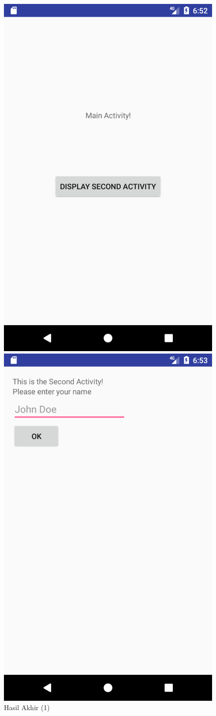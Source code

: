 \documentclass{scrartcl}
\begin{document}
\begin{enumerate}
	\begin{figure}[htbp]
	\begin{minipage}{.5\textwidth}
		\centering
		\includegraphics[width=0.7\linewidth]{Screenshot_1496836379}
		\caption{Hasil Akhir (1)}
		\label{fig:screenshot_1496836379}
	\end{minipage}
	\begin{minipage}{.5\textwidth}
		\centering
		\includegraphics[width=0.7\linewidth]{Screenshot_1496836388}

\end{minipage}
\end{figure}
\end{enumerate}
\end{document}
